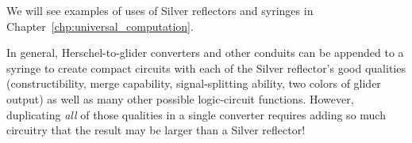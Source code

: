 We will see examples of uses of Silver reflectors and syringes in Chapter~\ref{chp:universal_computation}.

In general, Herschel-to-glider converters and other conduits can be appended to a syringe to create compact circuits with each of the Silver reflector's good qualities (constructibility, merge capability, signal-splitting ability, two colors of glider output) as well as many other possible logic-circuit functions.  However, duplicating \emph{all} of those qualities in a single converter requires adding so much circuitry that the result may be larger than a Silver reflector!






